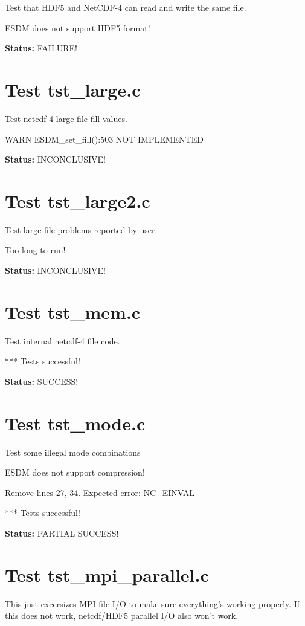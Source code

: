Test that HDF5 and NetCDF-4 can read and write the same file.

ESDM does not support HDF5 format!

{\bf \large Status: } FAILURE!

\section{Test tst\_large.c}

Test netcdf-4 large file fill values.

WARN ESDM\_set\_fill():503 NOT IMPLEMENTED

{\bf \large Status: } INCONCLUSIVE!

\section{Test tst\_large2.c}

Test large file problems reported by user.

Too long to run!

{\bf \large Status: } INCONCLUSIVE!

\section{Test tst\_mem.c}

Test internal netcdf-4 file code.

*** Tests successful!

{\bf \large Status: } SUCCESS!

\section{Test tst\_mode.c}

Test some illegal mode combinations

ESDM does not support compression!

Remove lines 27, 34. Expected error: NC\_EINVAL

*** Tests successful!

{\bf \large Status: } PARTIAL SUCCESS!

\section{Test tst\_mpi\_parallel.c}

This just excersizes MPI file I/O to make sure everything's working properly. If this does not work, netcdf/HDF5 parallel I/O also won't work.

